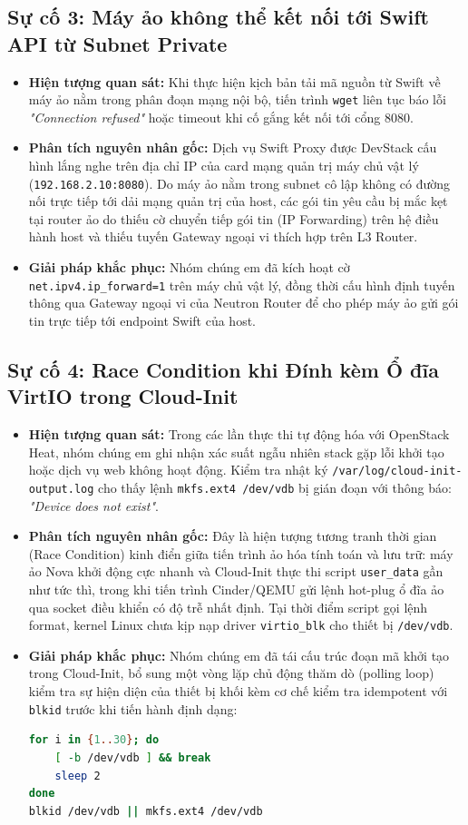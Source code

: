 \subsection{Sự cố 3: Máy ảo không thể kết nối tới Swift API từ Subnet Private}
\begin{itemize}
    \item \textbf{Hiện tượng quan sát:} Khi thực hiện kịch bản tải mã nguồn từ Swift về máy ảo nằm trong phân đoạn mạng nội bộ, tiến trình \texttt{wget} liên tục báo lỗi \textit{"Connection refused"} hoặc timeout khi cố gắng kết nối tới cổng 8080.
    \item \textbf{Phân tích nguyên nhân gốc:} Dịch vụ Swift Proxy được DevStack cấu hình lắng nghe trên địa chỉ IP của card mạng quản trị máy chủ vật lý (\texttt{192.168.2.10:8080}). Do máy ảo nằm trong subnet cô lập không có đường nối trực tiếp tới dải mạng quản trị của host, các gói tin yêu cầu bị mắc kẹt tại router ảo do thiếu cờ chuyển tiếp gói tin (IP Forwarding) trên hệ điều hành host và thiếu tuyến Gateway ngoại vi thích hợp trên L3 Router.
    \item \textbf{Giải pháp khắc phục:} Nhóm chúng em đã kích hoạt cờ \texttt{net.ipv4.ip\_forward=1} trên máy chủ vật lý, đồng thời cấu hình định tuyến thông qua Gateway ngoại vi của Neutron Router để cho phép máy ảo gửi gói tin trực tiếp tới endpoint Swift của host.
\end{itemize}

\subsection{Sự cố 4: Race Condition khi Đính kèm Ổ đĩa VirtIO trong Cloud-Init}
\begin{itemize}
    \item \textbf{Hiện tượng quan sát:} Trong các lần thực thi tự động hóa với OpenStack Heat, nhóm chúng em ghi nhận xác suất ngẫu nhiên stack gặp lỗi khởi tạo hoặc dịch vụ web không hoạt động. Kiểm tra nhật ký \texttt{/var/log/cloud-init-output.log} cho thấy lệnh \texttt{mkfs.ext4 /dev/vdb} bị gián đoạn với thông báo: \textit{"Device does not exist"}.
    \item \textbf{Phân tích nguyên nhân gốc:} Đây là hiện tượng tương tranh thời gian (Race Condition) kinh điển giữa tiến trình ảo hóa tính toán và lưu trữ: máy ảo Nova khởi động cực nhanh và Cloud-Init thực thi script \texttt{user\_data} gần như tức thì, trong khi tiến trình Cinder/QEMU gửi lệnh hot-plug ổ đĩa ảo qua socket điều khiển có độ trễ nhất định. Tại thời điểm script gọi lệnh format, kernel Linux chưa kịp nạp driver \texttt{virtio\_blk} cho thiết bị \texttt{/dev/vdb}.
    \item \textbf{Giải pháp khắc phục:} Nhóm chúng em đã tái cấu trúc đoạn mã khởi tạo trong Cloud-Init, bổ sung một vòng lặp chủ động thăm dò (polling loop) kiểm tra sự hiện diện của thiết bị khối kèm cơ chế kiểm tra idempotent với \texttt{blkid} trước khi tiến hành định dạng:
\begin{lstlisting}[language=bash]
for i in {1..30}; do
    [ -b /dev/vdb ] && break
    sleep 2
done
blkid /dev/vdb || mkfs.ext4 /dev/vdb
\end{lstlisting}
\end{itemize}

